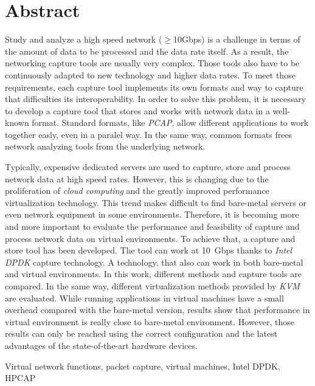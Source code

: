\chapter*{Abstract}

\begin{abstractEn}
Study and analyze a high speed network ($\geq$10Gbps) is a challenge in terms of the amount of data to be processed and the data rate itself. As a result, the networking capture tools are usually very complex. Those tools also have to be continuously adapted to new technology and higher data rates. To meet those requirements, each capture tool implements its own formats and way to capture that difficulties its interoperability. In order to solve this problem, it is necessary to develop a capture tool that stores and works with network data in a well-known format. Standard formats, like \textit{PCAP}, allow different applications to work together easly, even in a paralel way. In the same way, common formats frees network analyzing tools from the underlying network.

Typically, expensive dedicated servers are used to capture, store and process network data at high speed rates. However, this is changing due to the proliferation of \textit{cloud computing} and the greatly improved performance virtualization technology. This trend makes difficult to find bare-metal servers or even network equipment in some environments. Therefore, it is becoming more and more important to evaluate the performance and feasibility of capture and process network data on virtual environments. To achieve that, a capture and store tool has been developed.
The tool can work at 10~Gbps thanks to \textit{Intel DPDK} capture technology. A technology, that also can work in both bare-metal and virtual environments.
In this work, different methods and capture tools are compared. In the same way, different virtualization methods provided by \textit{KVM} are evaluated.
While running applications in virtual machines have a small overhead compared with the bare-metal version, results show that performance in virtual environment is really close to bare-metal environment. However, those results can only be reached using the correct configuration and the latest advantages of the state-of-the-art hardware devices.
\end{abstractEn}

\begin{keywordsEn}
Virtual network functions, packet capture, virtual machines, Intel DPDK, HPCAP
\end{keywordsEn}

